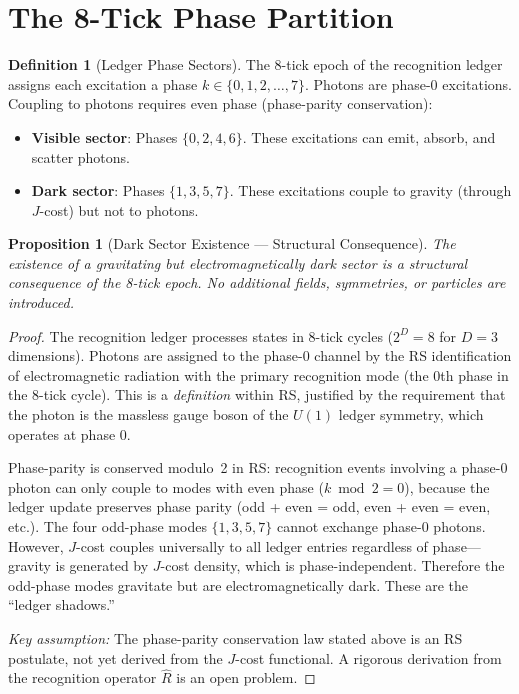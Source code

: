 \documentclass[12pt,a4paper]{article}
\newtheorem{proposition}[theorem]{Proposition}
\theoremstyle{definition}
\newtheorem{definition}[theorem]{Definition}
\theoremstyle{remark}
\begin{document}
\section{The 8-Tick Phase Partition}
\label{sec:partition}

\begin{definition}[Ledger Phase Sectors]
\label{def:sectors}
The 8-tick epoch of the recognition ledger assigns each
excitation a phase $k \in \{0, 1, 2, \ldots, 7\}$.
Photons are phase-0 excitations.  Coupling to photons
requires even phase (phase-parity conservation):
\begin{itemize}
  \item \textbf{Visible sector}: Phases $\{0, 2, 4, 6\}$.
  These excitations can emit, absorb, and scatter photons.
  \item \textbf{Dark sector}: Phases $\{1, 3, 5, 7\}$.
  These excitations couple to gravity (through $J$-cost)
  but not to photons.
\end{itemize}
\end{definition}

\begin{proposition}[Dark Sector Existence --- Structural Consequence]
\label{thm:dark-exists}
The existence of a gravitating but electromagnetically dark
sector is a structural consequence of the 8-tick epoch.  No
additional fields, symmetries, or particles are introduced.
\end{proposition}

\begin{proof}
The recognition ledger processes states in 8-tick cycles
($2^D = 8$ for $D = 3$ dimensions).  Photons are assigned
to the phase-$0$ channel by the RS identification of
electromagnetic radiation with the primary recognition mode
(the 0th phase in the 8-tick cycle).  This is a
\emph{definition} within RS, justified by the requirement
that the photon is the massless gauge boson of the $U(1)$
ledger symmetry, which operates at phase $0$.

Phase-parity is conserved modulo~2 in RS: recognition
events involving a phase-$0$ photon can only couple to
modes with even phase ($k \bmod 2 = 0$), because the
ledger update preserves phase parity (odd + even = odd,
even + even = even, etc.).  The four odd-phase modes
$\{1, 3, 5, 7\}$ cannot exchange phase-$0$ photons.
However, $J$-cost couples universally to all ledger entries
regardless of phase---gravity is generated by $J$-cost
density, which is phase-independent.  Therefore the odd-phase
modes gravitate but are electromagnetically dark.  These
are the ``ledger shadows.''

\emph{Key assumption:}  The phase-parity conservation law
stated above is an RS postulate, not yet derived from the
$J$-cost functional.  A rigorous derivation from the
recognition operator $\hat{R}$ is an open problem.
\end{proof}
\end{document}
